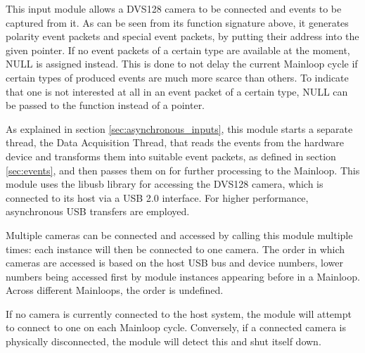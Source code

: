 \documentclass[a4paper,12pt]{report}
\begin{document}
This input module allows a DVS128 camera to be connected and events to be captured from it.
As can be seen from its function signature above, it generates polarity event packets and special event packets, by putting their address into the given pointer. If no event packets of a certain type are available at the moment, NULL is assigned instead. This is done to not delay the current Mainloop cycle if certain types of produced events are much more scarce than others. To indicate that one is not interested at all in an event packet of a certain type, NULL can be passed to the function instead of a pointer.

As explained in section \ref{sec:asynchronous_inputs}, this module starts a separate thread, the Data Acquisition Thread, that reads the events from the hardware device and transforms them into suitable event packets, as defined in section \ref{sec:events}, and then passes them on for further processing to the Mainloop.
This module uses the libusb library for accessing the DVS128 camera, which is connected to its host via a USB 2.0 interface. For higher performance, asynchronous USB transfers are employed.

Multiple cameras can be connected and accessed by calling this module multiple times: each instance will then be connected to one camera. The order in which cameras are accessed is based on the host USB bus and device numbers, lower numbers being accessed first by module instances appearing before in a Mainloop. Across different Mainloops, the order is undefined.

If no camera is currently connected to the host system, the module will attempt to connect to one on each Mainloop cycle. Conversely, if a connected camera is physically disconnected, the module will detect this and shut itself down.
\end{document}

